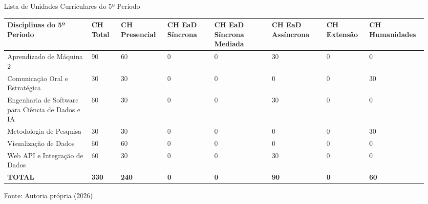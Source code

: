 \begin{quadro}[ht!]
\centering
\caption{Lista de Unidades Curriculares do 5º Período}
\label{quadro2.5}
\small
\begin{tabular}{|p{4.2cm}|p{1.2cm}|p{1.2cm}|p{1.2cm}|p{1.2cm}|p{1.2cm}|p{1.2cm}|p{1.2cm}|}
\hline
\rowcolor{gray!10} \textbf{Disciplinas do 5º Período} & \textbf{CH Total} & \textbf{CH Presencial} & \textbf{CH EaD Síncrona} & \textbf{CH EaD Síncrona Mediada} & \textbf{CH EaD Assíncrona} & \textbf{CH Extensão} & \textbf{CH Humanidades} \\ \hline
Aprendizado de Máquina 2 & 90 & 60 & 0 & 0 & 30 & 0 & 0 \\ \hline
Comunicação Oral e Estratégica & 30 & 30 & 0 & 0 & 0 & 0 & 30 \\ \hline
Engenharia de Software para Ciência de Dados e IA & 60 & 30 & 0 & 0 & 30 & 0 & 0 \\ \hline
Metodologia de Pesquisa & 30 & 30 & 0 & 0 & 0 & 0 & 30 \\ \hline
Visualização de Dados & 60 & 60 & 0 & 0 & 0 & 0 & 0 \\ \hline
Web API e Integração de Dados & 60 & 30 & 0 & 0 & 30 & 0 & 0 \\ \hline
\rowcolor{gray!20} \textbf{TOTAL} & \textbf{330} & \textbf{240} & \textbf{0} & \textbf{0} & \textbf{90} & \textbf{0} & \textbf{60} \\ \hline
\end{tabular}
\par\vspace{2pt}
\footnotesize{Fonte: Autoria própria (2026)}
\end{quadro}

